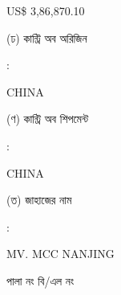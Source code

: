 \documentclass[12pt]{article}
\newcommand{\co}{CHINA}
\newcommand{\coship}{CHINA}
\newcommand{\vessel}{MV. MCC NANJING}
\newcommand{\price}{US\$ 3,86,870.10}
\begin{document}
\begin{minipage}[t]{0.50\linewidth}
{\price}
\\
\end{minipage}
\begin{minipage}[t]{0.05\linewidth}
\hspace*{1em}
\end{minipage}
\begin{minipage}[t]{0.45\linewidth}
(ঢ) কান্ট্রি অব অরিজিন
\end{minipage}
\begin{minipage}[t]{0.02\linewidth}
:
\end{minipage}
\begin{minipage}[t]{0.50\linewidth}
{\co}
\\
\end{minipage}
\begin{minipage}[t]{0.05\linewidth}
\hspace*{1em}
\end{minipage}
\begin{minipage}[t]{0.45\linewidth}
(ণ) কান্ট্রি অব শিপমেন্ট
\end{minipage}
\begin{minipage}[t]{0.02\linewidth}
:
\end{minipage}
\begin{minipage}[t]{0.50\linewidth}
{\coship}
\\
\end{minipage}
\begin{minipage}[t]{0.05\linewidth}
\hspace*{1em}
\end{minipage}
\begin{minipage}[t]{0.45\linewidth}
(ত) জাহাজের নাম
\end{minipage}
\begin{minipage}[t]{0.02\linewidth}
:
\end{minipage}
\begin{minipage}[t]{0.50\linewidth}
{\vessel}
\end{minipage}
\begin{minipage}[t]{0.05\linewidth}
\hspace*{1em}
\end{minipage}
\begin{minipage}[t]{0.45\linewidth}
\hspace*{1.8em}পালা নং বি/এল নং
\end{minipage}
\begin{minipage}[t]{0.02\linewidth}
\hspace{1em}
\end{minipage}
\end{document}
